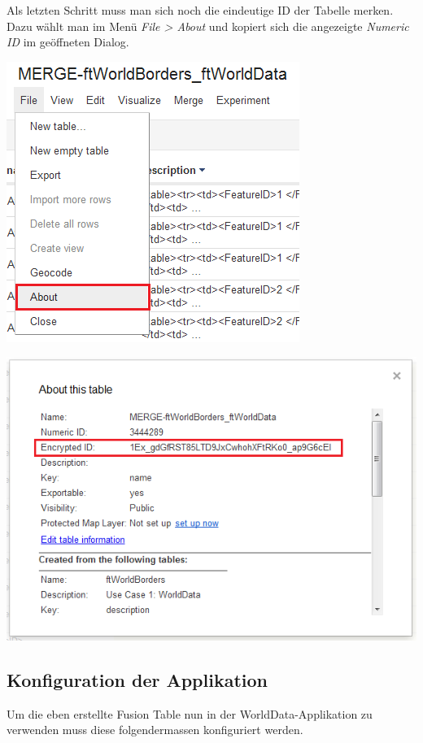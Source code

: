 Als letzten Schritt muss man sich noch die eindeutige ID der Tabelle merken. Dazu wählt man im Menü  \emph{File > About} und kopiert sich die angezeigte \emph{Numeric ID} im geöffneten Dialog.

\includegraphics{images/usecase1-worlddata/worlddata-prepare_fusiontableslayer3.png}

\includegraphics{images/usecase1-worlddata/worlddata-prepare_fusiontableslayer4.png}

\subsection{Konfiguration der Applikation}
Um die eben erstellte Fusion Table nun in der WorldData-Applikation zu verwenden muss diese folgendermassen konfiguriert werden.

